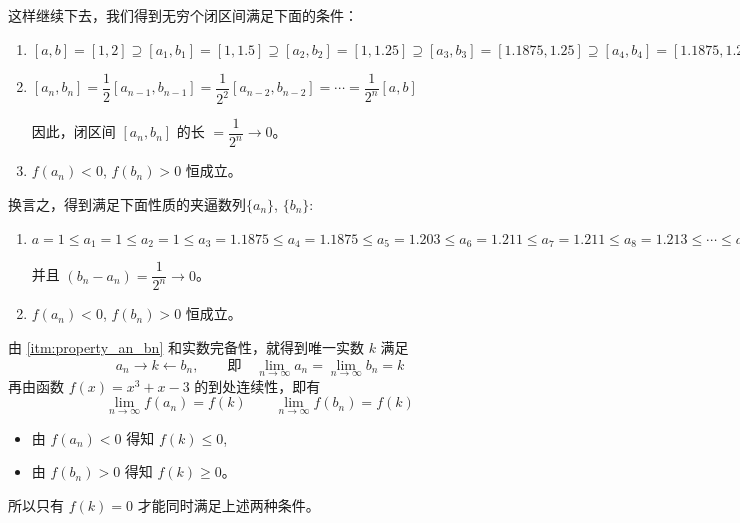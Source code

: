 \medskip
这样继续下去，我们得到无穷个闭区间满足下面的条件：
\begin{enumerate}[itemsep=7pt]
    \item $[a,b]=[1,2]\supseteq [a_1,b_1]=\left[1,1.5\right]\supseteq [a_2,b_2]=\left[1,1.25\right]\supseteq [a_3,b_3]=\left[1.1875,1.25\right] 
    \supseteq [a_4,b_4]=\left[1.1875,1.2188\right]\supseteq [a_5,b_5]=\left[1.203,1.2188\right]\supseteq [a_6,b_6]=\left[1.211,1.2188\right]\supseteq [a_7,b_7]=\left[1.211,1.215\right]\supseteq [a_8,b_8]=\left[1.213,1.215\right]\supseteq   \cdots 
    \supseteq  
    [a_n,b_n]=\supseteq\cdots $
    \item $[a_n,b_n]=\dfrac{1}{2}[a_{n-1},b_{n-1}]=\dfrac{1}{2^2}[a_{n-2},b_{n-2}]=\cdots=\dfrac{1}{2^n}[a,b]$
    
    因此，闭区间 $[a_n,b_n]$ 的长 $=\dfrac{1}{2^n}\to 0$。
    \item $f(a_n)<0$,\; $f(b_n)>0$ 恒成立。
\end{enumerate}

\medskip
换言之，得到满足下面性质的夹逼数列$\{a_n\}$, $\{b_n\}$:
\begin{enumerate}[itemsep=5pt]
    \item\label{itm:property_an_bn} $a=1\leqslant a_1=1\leqslant a_2=1\leqslant a_3=1.1875\leqslant a_4=1.1875  \leqslant  a_5=1.203  \leqslant  a_6=1.211  \leqslant  a_7=1.211  \leqslant  a_8=1.213  \le\cdots\leqslant a_n\le\cdots\leqslant b_n\leqslant \cdots \leqslant  b_8=1.215  \leqslant  b_7=1.215  \leqslant  b_6=1.2188  \leqslant  b_5=1.2188   \leqslant  b_4= 1.2188  \leqslant  b_3= 1.25 \leqslant  b_2=1.25  \leqslant  b_1=1.5  \leqslant  b=2$
    
    并且 $(b_n-a_n)=\dfrac{1}{2^n}\to 0$。

\item $f(a_n)<0$,\; $f(b_n)>0$ 恒成立。
\end{enumerate}

\medskip
由 \ref{itm:property_an_bn} 和实数完备性，就得到唯一实数 $k$ 满足
\[a_n\to k\leftarrow b_n,\qquad \text{即}\quad \lim_{n\to\infty} a_n=\lim_{n\to\infty}  b_n=k\]
再由函数 $f(x)=x^3+x-3$ 的到处连续性，即有
\[\lim_{n\to\infty}  f(a_n)=f(k) \qquad  \lim_{n\to\infty}  f(b_n)=f(k)\]
\begin{itemize}
  \item 由 $f(a_n)<0$ 得知 $f(k)\leqslant 0$,
  \item 由 $f(b_n)>0$ 得知 $f(k)\geqslant 0$。
\end{itemize}
所以只有 $f(k)=0$ 才能同时满足上述两种条件。


